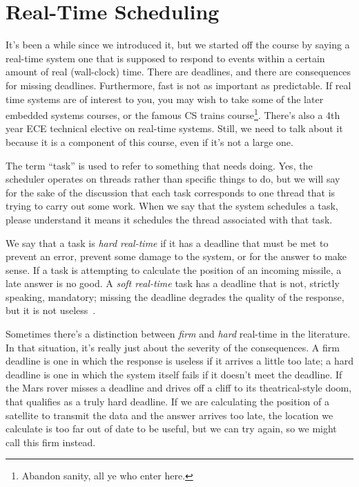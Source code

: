 




\section*{Real-Time Scheduling}
It's been a while since we introduced it, but we started off the course by saying a real-time system one that is supposed to respond to events within a certain amount of real (wall-clock) time. There are deadlines, and there are consequences for missing deadlines. Furthermore, fast is not as important as predictable. If real time systems are of interest to you, you may wish to take some of the later embedded systems courses, or the famous CS trains course\footnote{Abandon sanity, all ye who enter here.}. There's also a 4th year ECE technical elective on real-time systems. Still, we need to talk about it because it is a component of this course, even if it's not a large one.

The term ``task'' is used to refer to something that needs doing. Yes, the scheduler operates on threads rather than specific things to do, but we will say for the sake of the discussion that each task corresponds to one thread that is trying to carry out some work. When we say that the system schedules a task, please understand it means it schedules the thread associated with that task.

We say that a task is \textit{hard real-time} if it has a deadline that must be met to prevent an error, prevent some damage to the system, or for the answer to make sense. If a task is attempting to calculate the position of an incoming missile, a late answer is no good. A \textit{soft real-time} task has a deadline that is not, strictly speaking, mandatory; missing the deadline degrades the quality of the response, but it is not useless~\cite{osi}.

Sometimes there's a distinction between \textit{firm} and \textit{hard} real-time in the literature. In that situation, it's really just about the severity of the consequences. A firm deadline is one in which the response is useless if it arrives a little too late; a hard deadline is one in which the system itself fails if it doesn't meet the deadline. If the Mars rover misses a deadline and drives off a cliff to its theatrical-style doom, that qualifies as a truly hard deadline. If we are calculating the position of a satellite to transmit the data and the answer arrives too late, the location we calculate is too far out of date to be useful, but we can try again, so we might call this firm instead.

